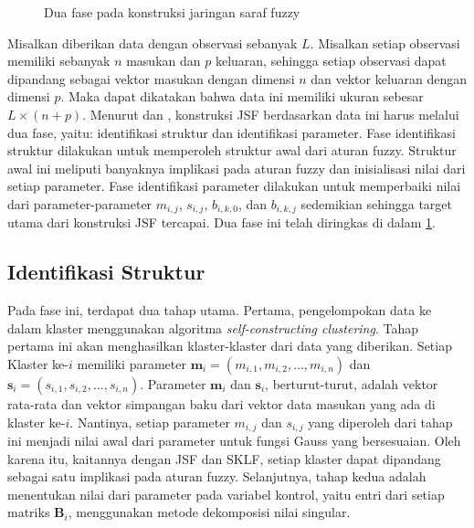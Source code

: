 \begin{figure}[htbp!]
    \centering
    \caption{Dua fase pada konstruksi jaringan saraf fuzzy}
    \label{fig:dua fase}
\end{figure}

\noindent Misalkan diberikan data dengan observasi sebanyak $L$. Misalkan setiap observasi memiliki sebanyak $n$ masukan dan $p$ keluaran, sehingga setiap observasi dapat dipandang sebagai vektor masukan dengan dimensi $n$ dan vektor keluaran dengan dimensi $p$. Maka dapat dikatakan bahwa data ini memiliki ukuran sebesar $L\times(n+p)$. Menurut  dan , konstruksi JSF berdasarkan data ini harus melalui dua fase, yaitu: identifikasi struktur dan identifikasi parameter. Fase identifikasi struktur dilakukan untuk memperoleh struktur awal dari aturan fuzzy. Struktur awal ini meliputi banyaknya implikasi pada aturan fuzzy dan inisialisasi nilai dari setiap parameter. Fase identifikasi parameter dilakukan untuk memperbaiki nilai dari parameter-parameter $m_{i,j}$, $s_{i,j}$, $b_{i,k,0}$, dan $b_{i,k,j}$ sedemikian sehingga target utama dari konstruksi JSF tercapai. Dua fase ini telah diringkas di dalam \ref{fig:dua fase}.

\subsection{Identifikasi Struktur}
\noindent Pada fase ini, terdapat dua tahap utama. Pertama, pengelompokan data ke dalam klaster menggunakan algoritma \emph{self-constructing clustering}. Tahap pertama ini akan menghasilkan klaster-klaster dari data yang diberikan. Setiap Klaster ke-$i$ memiliki parameter $\mathbf{m}_i=(m_{i,1}, m_{i,2}, \ldots, m_{i,n})$ dan $\mathbf{s}_i=(s_{i,1}, s_{i,2}, \ldots, s_{i,n})$. Parameter $\mathbf{m}_i$ dan $\mathbf{s}_i$, berturut-turut, adalah vektor rata-rata dan vektor simpangan baku dari vektor data masukan yang ada di klaster ke-$i$. Nantinya, setiap parameter $m_{i,j}$ dan $s_{i,j}$ yang diperoleh dari tahap ini menjadi nilai awal dari parameter untuk fungsi Gauss yang bersesuaian. Oleh karena itu, kaitannya dengan JSF dan SKLF, setiap klaster dapat dipandang sebagai satu implikasi pada aturan fuzzy. Selanjutnya, tahap kedua adalah menentukan nilai dari parameter pada variabel kontrol, yaitu entri dari setiap matriks $\mathbf{B}_i$, menggunakan metode dekomposisi nilai singular.

